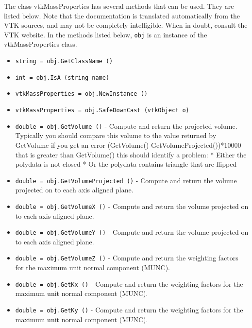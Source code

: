 The class vtkMassProperties has several methods that can be used.
  They are listed below.
Note that the documentation is translated automatically from the VTK sources,
and may not be completely intelligible.  When in doubt, consult the VTK website.
In the methods listed below, \verb|obj| is an instance of the vtkMassProperties class.
\begin{itemize}
\item  \verb|string = obj.GetClassName ()|

\item  \verb|int = obj.IsA (string name)|

\item  \verb|vtkMassProperties = obj.NewInstance ()|

\item  \verb|vtkMassProperties = obj.SafeDownCast (vtkObject o)|

\item  \verb|double = obj.GetVolume ()| -  Compute and return the projected volume.
 Typically you should compare this volume to the value returned by GetVolume
 if you get an error (GetVolume()-GetVolumeProjected())*10000 that is greater
 than GetVolume() this should identify a problem:
 * Either the polydata is not closed
 * Or the polydata contains triangle that are flipped

\item  \verb|double = obj.GetVolumeProjected ()| -  Compute and return the volume projected on to each axis aligned plane.

\item  \verb|double = obj.GetVolumeX ()| -  Compute and return the volume projected on to each axis aligned plane.

\item  \verb|double = obj.GetVolumeY ()| -  Compute and return the volume projected on to each axis aligned plane.

\item  \verb|double = obj.GetVolumeZ ()| -  Compute and return the weighting factors for the maximum unit
 normal component (MUNC).

\item  \verb|double = obj.GetKx ()| -  Compute and return the weighting factors for the maximum unit
 normal component (MUNC).

\item  \verb|double = obj.GetKy ()| -  Compute and return the weighting factors for the maximum unit
 normal component (MUNC).


\end{itemize}
